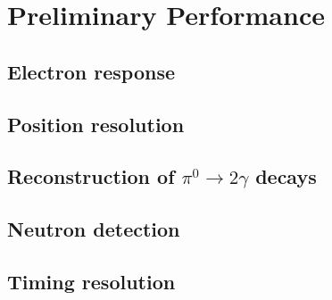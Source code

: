 \section{Preliminary Performance}

\subsection{Electron response}
\subsection{Position resolution}
\subsection{Reconstruction of $\pi^0\rightarrow 2\gamma$ decays}
\subsection{Neutron detection}
\subsection{Timing resolution}





